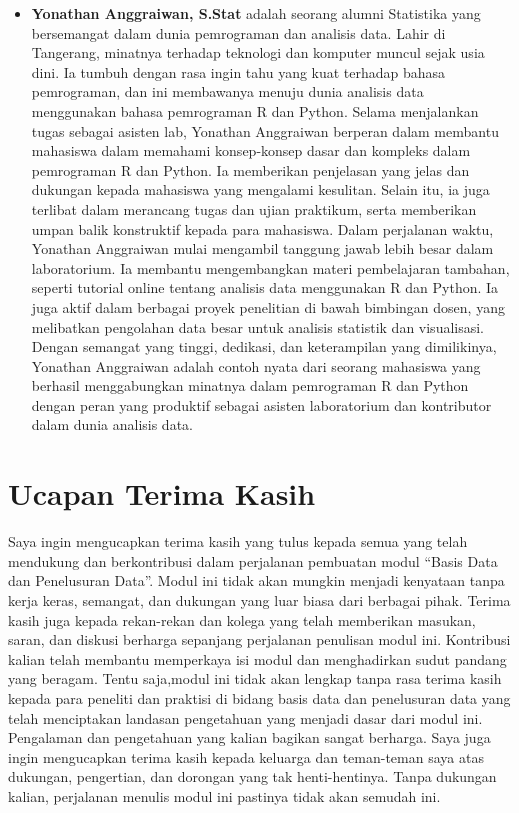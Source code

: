 \documentclass[
]{book}
\providecommand{\tightlist}{%
  \setlength{\itemsep}{0pt}\setlength{\parskip}{0pt}}
\begin{document}
\begin{itemize}
\tightlist
\item
  \textbf{Yonathan Anggraiwan, S.Stat} adalah seorang alumni Statistika yang bersemangat dalam dunia pemrograman dan analisis data. Lahir di Tangerang, minatnya terhadap teknologi dan komputer muncul sejak usia dini. Ia tumbuh dengan rasa ingin tahu yang kuat terhadap bahasa pemrograman, dan ini membawanya menuju dunia analisis data menggunakan bahasa pemrograman R dan Python. Selama menjalankan tugas sebagai asisten lab, Yonathan Anggraiwan berperan dalam membantu mahasiswa dalam memahami konsep-konsep dasar dan kompleks dalam pemrograman R dan Python. Ia memberikan penjelasan yang jelas dan dukungan kepada mahasiswa yang mengalami kesulitan. Selain itu, ia juga terlibat dalam merancang tugas dan ujian praktikum, serta memberikan umpan balik konstruktif kepada para mahasiswa. Dalam perjalanan waktu, Yonathan Anggraiwan mulai mengambil tanggung jawab lebih besar dalam laboratorium. Ia membantu mengembangkan materi pembelajaran tambahan, seperti tutorial online tentang analisis data menggunakan R dan Python. Ia juga aktif dalam berbagai proyek penelitian di bawah bimbingan dosen, yang melibatkan pengolahan data besar untuk analisis statistik dan visualisasi. Dengan semangat yang tinggi, dedikasi, dan keterampilan yang dimilikinya, Yonathan Anggraiwan adalah contoh nyata dari seorang mahasiswa yang berhasil menggabungkan minatnya dalam pemrograman R dan Python dengan peran yang produktif sebagai asisten laboratorium dan kontributor dalam dunia analisis data.
\end{itemize}

\hypertarget{ucapan-terima-kasih}{%
\section*{Ucapan Terima Kasih}\label{ucapan-terima-kasih}}

Saya ingin mengucapkan terima kasih yang tulus kepada semua yang telah mendukung dan berkontribusi dalam perjalanan pembuatan modul ``Basis Data dan Penelusuran Data''. Modul ini tidak akan mungkin menjadi kenyataan tanpa kerja keras, semangat, dan dukungan yang luar biasa dari berbagai pihak. Terima kasih juga kepada rekan-rekan dan kolega yang telah memberikan masukan, saran, dan diskusi berharga sepanjang perjalanan penulisan modul ini. Kontribusi kalian telah membantu memperkaya isi modul dan menghadirkan sudut pandang yang beragam. Tentu saja,modul ini tidak akan lengkap tanpa rasa terima kasih kepada para peneliti dan praktisi di bidang basis data dan penelusuran data yang telah menciptakan landasan pengetahuan yang menjadi dasar dari modul ini. Pengalaman dan pengetahuan yang kalian bagikan sangat berharga. Saya juga ingin mengucapkan terima kasih kepada keluarga dan teman-teman saya atas dukungan, pengertian, dan dorongan yang tak henti-hentinya. Tanpa dukungan kalian, perjalanan menulis modul ini pastinya tidak akan semudah ini.
\end{document}

